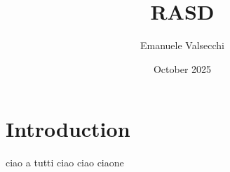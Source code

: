 \documentclass{article}
\title{RASD}
\author{Emanuele Valsecchi}
\date{October 2025}
\begin{document}
\maketitle

\section{Introduction}

ciao a tutti
ciao ciao
ciaone
\end{document}
